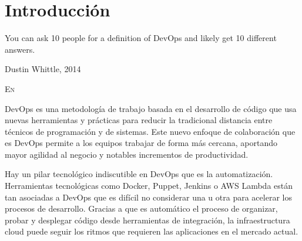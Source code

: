 \chapter{Introducción}\label{chp-01}
\epigraph{You can ask 10 people for a definition of DevOps and likely get 10 different answers.}{Dustin Whittle, 2014}

\lettrine[lraise=-0.1, lines=2, loversize=0.2]{E}{n} 






DevOps es una metodología de trabajo basada en el desarrollo de código que usa nuevas herramientas y prácticas para reducir la tradicional distancia entre técnicos de programación y de sistemas. Este nuevo enfoque de colaboración que es DevOps permite a los equipos trabajar de forma más cercana, aportando mayor agilidad al negocio y notables incrementos de productividad.




Hay un pilar tecnológico indiscutible en DevOps que es la automatización. Herramientas tecnológicas como Docker, Puppet, Jenkins o AWS Lambda están tan asociadas a DevOps que es difícil no considerar una u otra para acelerar los procesos de desarrollo. Gracias a que es automático el proceso de organizar, probar y desplegar código desde herramientas de integración, la infraestructura cloud puede seguir los ritmos que requieren las aplicaciones en el mercado actual.



\endinput
